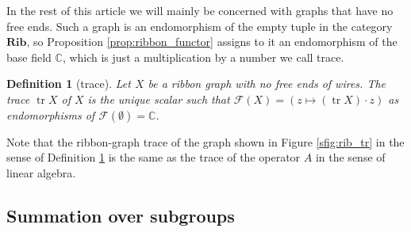 \documentclass{amsart}
\newtheorem{definition}[conjecture]{Definition}
\newcommand{\tr}{\operatorname{tr}}
\begin{document}
In the rest of this article we will mainly be concerned with graphs that have no free ends. Such a graph is an endomorphism of the empty tuple in the category $\mathbf{Rib}$, so Proposition \ref{prop:ribbon_functor} assigns to it an endomorphism of the base field $\mathbb{C}$, which is just a multiplication by a number we call trace.
\begin{definition}[trace]\label{def:ribbon_trace}
Let $X$ be a ribbon graph with no free ends of wires. The trace $\tr X$ of $X$ is the unique scalar such that $\mathcal{F}(X)=(z\mapsto(\tr X)\cdot z)$ as endomorphisms of $\mathcal{F}(\emptyset)=\mathbb{C}$.
\end{definition}
Note that the ribbon-graph trace of the graph shown in Figure \ref{sfig:rib_tr} in the sense of Definition \ref{def:ribbon_trace} is the same as the trace of the operator $A$ in the sense of linear algebra.

\subsection{Summation over subgroups}\label{ssec:sum_subgp}
\end{document}
